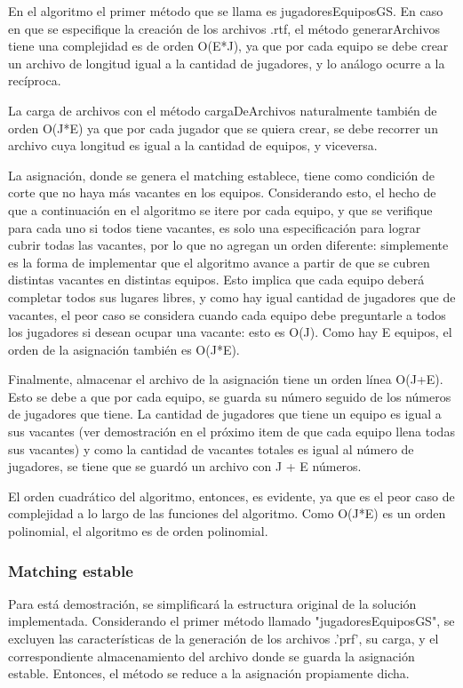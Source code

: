 \documentclass[article,a4paper]{article}
\begin{document}
En el algoritmo el primer método que se llama es jugadoresEquiposGS. En caso en que se especifique la creación de los archivos .rtf, el método generarArchivos tiene una complejidad es de orden O(E*J), ya que por cada equipo se debe crear un archivo de longitud igual a la cantidad de jugadores, y lo análogo ocurre a la recíproca.

La carga de archivos con el método cargaDeArchivos naturalmente también de orden O(J*E) ya que por cada jugador que se quiera crear, se debe recorrer un archivo cuya longitud es igual a la cantidad de equipos, y viceversa.

La asignación, donde se genera el matching establece, tiene como condición de corte que no haya más vacantes en los equipos. Considerando esto, el hecho de que a continuación en el algoritmo se itere por cada equipo, y que se verifique para cada uno si todos tiene vacantes, es solo una especificación para lograr cubrir todas las vacantes, por lo que no agregan un orden diferente: simplemente es la forma de implementar que el algoritmo avance a partir de que se cubren distintas vacantes en distintas equipos. Esto implica que cada equipo deberá completar todos sus lugares libres, y como hay igual cantidad de jugadores que de vacantes, el peor caso se considera cuando cada equipo debe preguntarle a todos los jugadores si desean ocupar una vacante: esto es O(J). Como hay E equipos, el orden de la asignación también es O(J*E).

Finalmente, almacenar el archivo de la asignación tiene un orden línea O(J+E). Esto se debe a que por cada equipo, se guarda su número seguido de los números de jugadores que tiene. La cantidad de jugadores que tiene un equipo es igual a sus vacantes (ver demostración en el próximo item de que cada equipo llena todas sus vacantes) y como la cantidad de vacantes totales es igual al número de jugadores, se tiene que se guardó un archivo con J + E números.

El orden cuadrático del algoritmo, entonces, es evidente, ya que es el peor caso de complejidad a lo largo de las funciones del algoritmo. Como O(J*E) es un orden polinomial, el algoritmo es de orden polinomial.

\subsubsection{Matching estable}

Para está demostración, se simplificará la estructura original de la solución implementada. Considerando el primer método llamado "jugadoresEquiposGS", se excluyen las características de la generación de los archivos .'prf', su carga, y el correspondiente almacenamiento del archivo donde se guarda la asignación estable. Entonces, el método se reduce a la asignación propiamente dicha.
\end{document}
